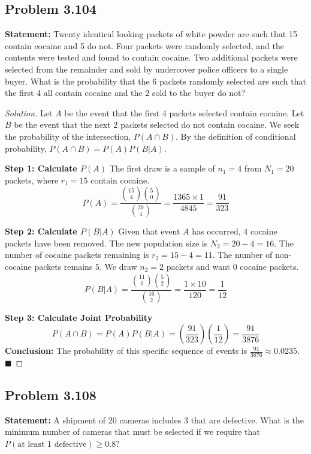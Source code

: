 \documentclass[11pt]{article}
\theoremstyle{definition}
\theoremstyle{remark}
\begin{document}
\subsection*{Problem 3.104}
\textbf{Statement:} Twenty identical looking packets of white powder are such that 15 contain cocaine and 5 do not. Four packets were randomly selected, and the contents were tested and found to contain cocaine. Two additional packets were selected from the remainder and sold by undercover police officers to a single buyer. What is the probability that the 6 packets randomly selected are such that the first 4 all contain cocaine and the 2 sold to the buyer do not?

\begin{proof}[Solution]
Let $A$ be the event that the first 4 packets selected contain cocaine. Let $B$ be the event that the next 2 packets selected do not contain cocaine. We seek the probability of the intersection, $P(A \cap B)$.
By the definition of conditional probability, $P(A \cap B) = P(A)P(B|A)$.

\textbf{Step 1: Calculate $P(A)$}
The first draw is a sample of $n_1 = 4$ from $N_1 = 20$ packets, where $r_1 = 15$ contain cocaine.
\[ P(A) = \frac{\binom{15}{4}\binom{5}{0}}{\binom{20}{4}} = \frac{1365 \times 1}{4845} = \frac{91}{323} \]

\textbf{Step 2: Calculate $P(B|A)$}
Given that event $A$ has occurred, 4 cocaine packets have been removed. The new population size is $N_2 = 20 - 4 = 16$. The number of cocaine packets remaining is $r_2 = 15 - 4 = 11$. The number of non-cocaine packets remains $5$. We draw $n_2 = 2$ packets and want $0$ cocaine packets.
\[ P(B|A) = \frac{\binom{11}{0}\binom{5}{2}}{\binom{16}{2}} = \frac{1 \times 10}{120} = \frac{1}{12} \]

\textbf{Step 3: Calculate Joint Probability}
\[ P(A \cap B) = P(A)P(B|A) = \left(\frac{91}{323}\right) \left(\frac{1}{12}\right) = \frac{91}{3876} \]
\textbf{Conclusion:} The probability of this specific sequence of events is $\frac{91}{3876} \approx 0.0235$. $\blacksquare$
\end{proof}

\subsection*{Problem 3.108}
\textbf{Statement:} A shipment of 20 cameras includes 3 that are defective. What is the minimum number of cameras that must be selected if we require that $P(\text{at least 1 defective}) \ge 0.8$?
\end{document}
